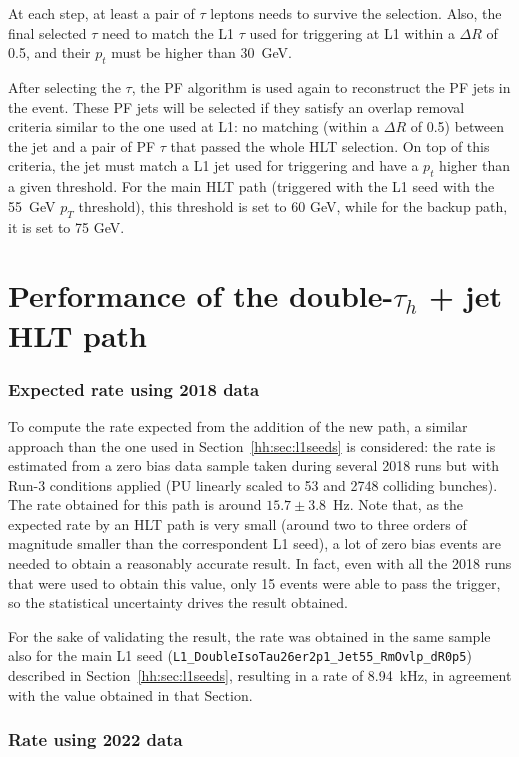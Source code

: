 \documentclass[../main.tex]{subfiles}
\begin{document}
At each step, at least a pair of $\tau$ leptons needs to survive the selection. Also, the final selected $\tau$ need to match the L1 $\tau$ used for triggering at L1 within a $\Delta R$ of 0.5, and their $p_t$ must be higher than 30~GeV.

After selecting the $\tau$, the PF algorithm is used again to reconstruct the PF jets in the event. These PF jets will be selected if they satisfy an overlap removal criteria similar to the one used at L1: no matching (within a $\Delta R$ of 0.5) between the jet and a pair of PF $\tau$ that passed the whole HLT selection. On top of this criteria, the jet must match a L1 jet used for triggering and have a $p_t$ higher than a given threshold. For the main HLT path (triggered with the L1 seed with the 55~GeV $p_T$ threshold), this threshold is set to 60 GeV, while for the backup path, it is set to 75 GeV.

\section{Performance of the double-$\tau_h$ + jet HLT path}

\subsubsection{Expected rate using 2018 data}

To compute the rate expected from the addition of the new path, a similar approach than the one used in Section~\ref{hh:sec:l1seeds} is considered: the rate is estimated from a zero bias data sample taken during several 2018 runs but with Run-3 conditions applied (PU linearly scaled to 53 and 2748 colliding bunches). The rate obtained for this path is around $15.7\pm3.8$~Hz. Note that, as the expected rate by an HLT path is very small (around two to three orders of magnitude smaller than the correspondent L1 seed), a lot of zero bias events are needed to obtain a reasonably accurate result. In fact, even with all the 2018 runs that were used to obtain this value, only 15 events were able to pass the trigger, so the statistical uncertainty drives the result obtained.

For the sake of validating the result, the rate was obtained in the same sample also for the main L1 seed (\texttt{L1\_DoubleIsoTau26er2p1\_Jet55\_RmOvlp\_dR0p5}) described in Section~\ref{hh:sec:l1seeds}, resulting in a rate of 8.94~kHz, in agreement with the value obtained in that Section. 

\subsubsection{Rate using 2022 data}
\end{document}

